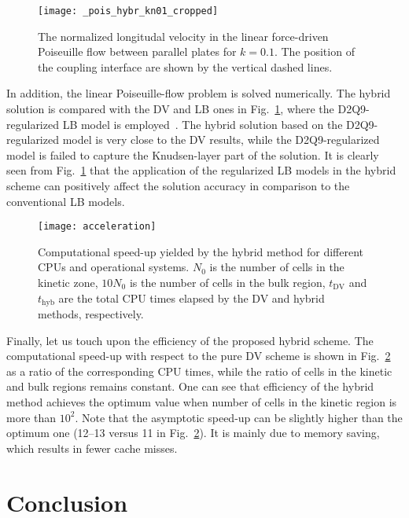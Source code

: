 \documentclass{elsarticle} %
\newcommand{\DV}{\mathrm{DV}}
\begin{document}
\begin{figure}
    \centering
    \texttt{[image: \_pois\_hybr\_kn01\_cropped]}
    \caption{
        The normalized longitudal velocity in the linear force-driven Poiseuille flow between parallel plates for $k=0.1$.
        The position of the coupling interface are shown by the vertical dashed lines.
    }\label{fig:poiseuille}
\end{figure}

In addition, the linear Poiseuille-flow problem is solved numerically.
The hybrid solution is compared with the DV and LB ones in Fig.~\ref{fig:poiseuille},
where the D2Q9-regularized LB model is employed~\cite{Latt2006, Mont2015}.
The hybrid solution based on the D2Q9-regularized model is very close to the DV results,
while the D2Q9-regularized model is failed to capture the Knudsen-layer part of the solution.
It is clearly seen from Fig.~\ref{fig:poiseuille} that the application of the regularized LB models in the hybrid scheme
can positively affect the solution accuracy in comparison to the conventional LB models.

\begin{figure}
    \centering
    \texttt{[image: acceleration]}
    \caption{
        Computational speed-up yielded by the hybrid method for different CPUs and operational systems.
        $N_0$ is the number of cells in the kinetic zone, $10N_0$ is the number of cells in the bulk region,
        $t_\DV$ and $t_\mathrm{hyb}$ are the total CPU times elapsed by the DV and hybrid methods, respectively.
    }\label{fig:speed-up}
\end{figure}

Finally, let us touch upon the efficiency of the proposed hybrid scheme.
The computational speed-up with respect to the pure DV scheme is shown in Fig.~\ref{fig:speed-up} as a ratio of the corresponding CPU times,
while the ratio of cells in the kinetic and bulk regions remains constant.
One can see that efficiency of the hybrid method achieves the optimum value when number of cells in the kinetic region is more than $10^2$.
Note that the asymptotic speed-up can be slightly higher than the optimum one (12--13 versus 11 in Fig.~\ref{fig:speed-up}).
It is mainly due to memory saving, which results in fewer cache misses.

\section{Conclusion}\label{sec:summary}
\end{document}
